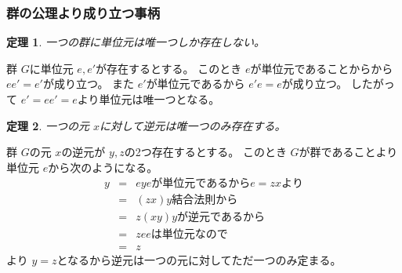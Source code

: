 \documentclass[dvipdfmx]{jsarticle}
\newtheorem{theo}{定理}
\begin{document}
\subsubsection{群の公理より成り立つ事柄}
\begin{theo}
  一つの群に単位元は唯一つしか存在しない。
\end{theo}

群 $G$に単位元 $e,e'$が存在するとする。
このとき $e$が単位元であることからから $ee' = e'$が成り立つ。
また $e'$が単位元であるから $e'e = e$が成り立つ。
したがって $e' = ee' = e$より単位元は唯一つとなる。

\begin{theo}
  一つの元 $x$に対して逆元は唯一つのみ存在する。
\end{theo}

群 $G$の元 $x$の逆元が $y,z$の2つ存在するとする。
このとき $G$が群であることより単位元 $e$から次のようになる。
\begin{eqnarray*}
  y & = & ey　　　　eが単位元であるから e = zxより \\
    & = & (zx)y　　　結合法則から \\
    & = & z(xy)　　　yが逆元であるから \\
    & = & ze　　　　eは単位元なので \\
    & = & z
\end{eqnarray*}
より $y = z$となるから逆元は一つの元に対してただ一つのみ定まる。
\end{document}
